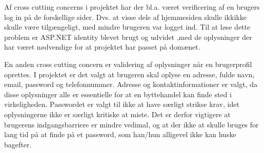 Af cross cutting concerns i projektet har der bl.a. været verificering af en brugers log in på de forskellige sider. Dvs. at visse dele af hjemmesiden skulle ikkikke skulle være tilgængeligt, med mindre brugeren var logget ind. Til at løse dette problem er ASP.NET identity\cite{Identity} blevet brugt og udvidet ,med de oplysninger der har været nødvendige for at projektet har passet på domænet.

En anden cross cutting concern er validering af oplysninger når en brugerprofil oprettes. I projektet er det valgt at brugeren skal oplyse en adresse, fulde navn, email, password og telefonnummer. Adresse og kontaktinformationer er valgt, da disse oplysninger alle er essentielle for at en byttehandel kan finde sted i virkeligheden. Passwordet er valgt til ikke at have særligt strikse krav, idet oplysningerne ikke er særligt kritiske at miste. Det er derfor vigtigere at brugerens indgangsbarriere er mindre vedimal, og at der ikke at skulle bruges for lang tid på at finde på et password, som han/hun alligevel ikke kan huske bagefter.